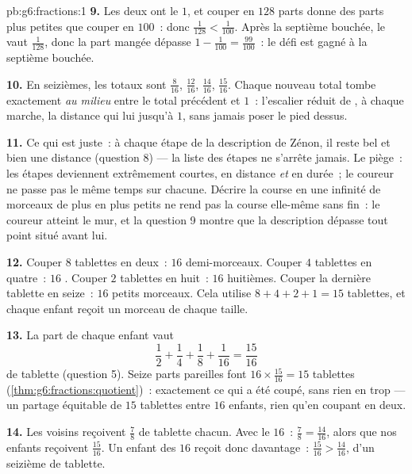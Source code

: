 \begin{solution}{pb:g6:fractions:1}
\textbf{9.} Les deux  ont le  $1$, et couper en
$128$ parts donne des parts plus petites que couper en $100$~: donc
$\frac{1}{128} < \frac{1}{100}$. Après la septième bouchée, le 
vaut $\frac{1}{128}$, donc la part mangée dépasse
$1 - \frac{1}{100} = \frac{99}{100}$~: le défi est gagné à la
septième bouchée.

\textbf{10.} En seizièmes, les totaux sont $\frac{8}{16}$,
$\frac{12}{16}$, $\frac{14}{16}$, $\frac{15}{16}$. Chaque nouveau
total tombe exactement \emph{au milieu} entre le total précédent et
$1$~: l'escalier réduit de , à chaque marche, la distance qui
lui  jusqu'à $1$, sans jamais poser le pied dessus.

\textbf{11.} Ce qui est juste~: à chaque étape de la description de
Zénon, il reste bel et bien une distance (question 8) --- la liste
des étapes ne s'arrête jamais. Le piège~: les étapes deviennent
extrêmement courtes, en distance \emph{et} en durée~; le coureur ne
passe pas le même temps sur chacune. Décrire la course en une
infinité de morceaux de plus en plus petits ne rend pas la course
elle-même sans fin~: le coureur atteint le mur, et la question 9
montre que la description dépasse tout point situé avant lui.

\textbf{12.} Couper $8$ tablettes en deux~: $16$ demi-morceaux.
Couper $4$ tablettes en quatre~: $16$ . Couper $2$ tablettes en
huit~: $16$ huitièmes. Couper la dernière tablette en seize~: $16$
petits morceaux. Cela utilise $8 + 4 + 2 + 1 = 15$ tablettes, et
chaque enfant reçoit un morceau de chaque taille.

\textbf{13.} La part de chaque enfant vaut
\[
\frac12 + \frac14 + \frac18 + \frac{1}{16} = \frac{15}{16}
\]
de tablette (question 5). Seize parts pareilles font
$16 \times \frac{15}{16} = 15$ tablettes
(\cref{thm:g6:fractions:quotient})~: exactement ce qui a été coupé,
sans rien en trop --- un partage équitable de $15$ tablettes entre
$16$ enfants, rien qu'en coupant en deux.

\textbf{14.} Les voisins reçoivent $\frac78$ de tablette chacun. Avec
le  $16$~: $\frac78 = \frac{14}{16}$, alors que nos
enfants reçoivent $\frac{15}{16}$. Un enfant des $16$ reçoit donc
davantage~: $\frac{15}{16} > \frac{14}{16}$, d'un seizième de
tablette.


\end{solution}
